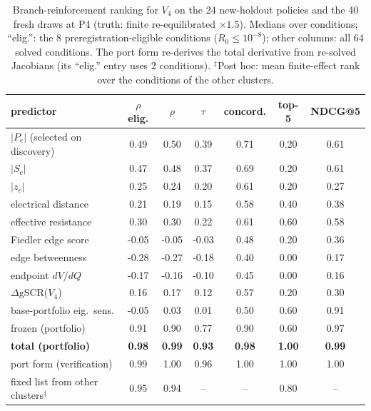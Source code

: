 \begin{table}[!t]
\centering
\caption{Branch-reinforcement ranking for $V_4$ on the 24 new-holdout policies and the 40 fresh draws at P4 (truth: finite re-equilibrated $\times1.5$). Medians over conditions; ``elig.'': the 8 preregistration-eligible conditions ($R_0\le10^{-8}$); other columns: all 64 solved conditions. The port form re-derives the total derivative from re-solved Jacobians (its ``elig.'' entry uses 2 conditions). $^\ddagger$Post hoc: mean finite-effect rank over the conditions of the other clusters.}\label{tab:goldb}
\scriptsize
\setlength{\tabcolsep}{2.2pt}
\begin{tabular}{@{}lcccccc@{}}
\toprule
predictor & $\rho$ elig. & $\rho$ & $\tau$ & concord. & top-5 & NDCG@5 \\
\midrule
$|P_e|$ (selected on discovery) & 0.49 & 0.50 & 0.39 & 0.71 & 0.20 & 0.61 \\
$|S_e|$ & 0.47 & 0.48 & 0.37 & 0.69 & 0.20 & 0.61 \\
$|z_e|$ & 0.25 & 0.24 & 0.20 & 0.61 & 0.20 & 0.27 \\
electrical distance & 0.21 & 0.19 & 0.15 & 0.58 & 0.40 & 0.38 \\
effective resistance & 0.30 & 0.30 & 0.22 & 0.61 & 0.60 & 0.58 \\
Fiedler edge score & -0.05 & -0.05 & -0.03 & 0.48 & 0.20 & 0.36 \\
edge betweenness & -0.28 & -0.27 & -0.18 & 0.40 & 0.00 & 0.17 \\
endpoint $dV/dQ$ & -0.17 & -0.16 & -0.10 & 0.45 & 0.00 & 0.16 \\
$\Delta$gSCR($V_4$) & 0.16 & 0.17 & 0.12 & 0.57 & 0.20 & 0.30 \\
\midrule
base-portfolio eig.\ sens. & -0.05 & 0.03 & 0.01 & 0.50 & 0.60 & 0.91 \\
frozen (portfolio) & 0.91 & 0.90 & 0.77 & 0.90 & 0.60 & 0.97 \\
\textbf{total (portfolio)} & \textbf{0.98} & \textbf{0.99} & \textbf{0.93} & \textbf{0.98} & \textbf{1.00} & \textbf{0.99} \\
port form (verification) & 0.99 & 1.00 & 0.96 & 1.00 & 1.00 & 1.00 \\
\midrule
fixed list from other clusters$^\ddagger$ & 0.95 & 0.94 & -- & -- & 0.80 & -- \\
\bottomrule
\end{tabular}
\end{table}
